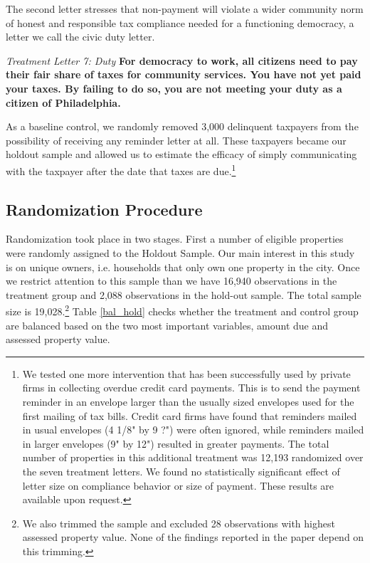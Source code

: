 \documentclass[12pt]{article}
\begin{document}
The second letter stresses that non-payment will violate a wider
community norm of honest and responsible tax compliance needed for a
functioning democracy, a letter we call the civic duty letter. 

{\it Treatment Letter 7: Duty } {\bf For democracy to work, all
  citizens need to pay their fair share of taxes for community
  services. You have not yet paid your taxes. By failing to do so, you
  are not meeting your duty as a citizen of Philadelphia.}


As a baseline control, we randomly removed 3,000 delinquent taxpayers
from the possibility of receiving any reminder letter at all.  These
taxpayers became our holdout sample and allowed us to estimate the
efficacy of simply communicating with the taxpayer after the date that
taxes are due.\footnote{We tested one more intervention that has been
  successfully used by private firms in collecting overdue credit card
  payments.  This is to send the payment reminder in an envelope
  larger than the usually sized envelopes used for the first mailing
  of tax bills.  Credit card firms have found that reminders mailed in
  usual envelopes (4 1/8" by 9 ?") were often ignored, while reminders
  mailed in larger envelopes (9" by 12") resulted in greater payments.
  The total number of properties in this additional treatment was
  12,193 randomized over the seven treatment letters.  We found no
  statistically significant effect of letter size on compliance
  behavior or size of payment.  These results are available upon
  request.}
	
\subsection{Randomization Procedure}

Randomization took place in two stages.  First a number of eligible
properties were randomly assigned to the Holdout Sample.  Our main
interest in this study is on unique owners, i.e. households that only
own one property in the city. Once we restrict attention to this
sample than we have 16,940 observations in the treatment group and
2,088 observations in the hold-out sample.  The total sample size is
19,028.\footnote{We also trimmed the sample and excluded 28
  observations with highest assessed property value. None of the
  findings reported in the paper depend on this trimming.}  Table
\ref{bal_hold} checks whether the treatment and control group are
balanced based on the two most important variables, amount due and
assessed property value.
\end{document}
